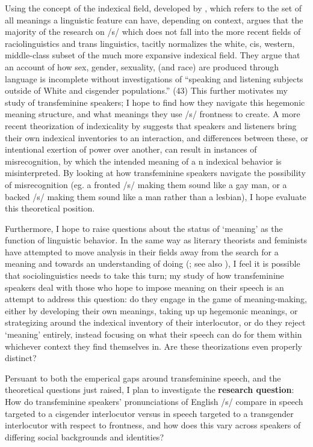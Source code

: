 \documentclass[11pt]{article}
\begin{document}
Using the concept of the indexical field, developed by \textcite{eckert_variation_2008}, which refers to the set of all meanings a linguistic feature can have, depending on context,  \textcite{calder_whose_2021} argues that the majority of the research on /s/ which does not fall into the more recent fields of raciolinguistics and trans linguistics, tacitly normalizes the white, cis, western, middle-class subset of the much more expansive indexical field. They argue that an account of how sex, gender, sexuality, (and race) are produced through language is incomplete without investigations of ``speaking and listening subjects outside of White and cisgender populations.'' (43) This further motivates my study of transfeminine speakers; I hope to find how they navigate this hegemonic meaning structure, and what meanings they use /s/ frontness to create. A more recent theorization of indexicality by \textcite{barrett_sexuality_2024} suggests that speakers and listeners bring their own indexical inventories to an interaction, and differences between these, or intentional exertion of power over another, can result in instances of misrecognition, by which the intended meaning of a n indexical behavior is misinterpreted. By looking at how transfeminine speakers navigate the possibility of misrecognition (eg. a fronted /s/ making them sound like a gay man, or a backed /s/ making them sound like a man rather than a lesbian), I hope evaluate this theoretical position.

Furthermore, I hope to raise questions about the status of `meaning' as the function of linguistic behavior. In the same way as literary theorists and feminists have attempted to move analysis in their fields away from the search for a meaning and towards an understanding of doing (\cite{deleuze_november_1987, butler_gender_1990}; see also \cite{livia_its_1997}), I feel it is possible that sociolinguistics needs to take this turn; my study of how transfeminine speakers deal with those who hope to impose meaning on their speech is an attempt to address this question: do they engage in the game of meaning-making, either by developing their own meanings, taking up up hegemonic meanings, or strategizing around the indexical inventory of their interlocutor, or do they reject `meaning' entirely, instead focusing on what their speech can do for them within whichever context they find themselves in. Are these theorizations even properly distinct?


Persuant to both the emperical gaps around transfeminine speech, and the theoretical questions just raised, I plan to investigate the \textbf{research question}: How do transfeminine speakers' pronunciations of English /s/ compare in speech targeted to a cisgender interlocutor versus in speech targeted to a transgender interlocutor with respect to frontness, and how does this vary across speakers of differing social backgrounds and identities? 
\end{document}
